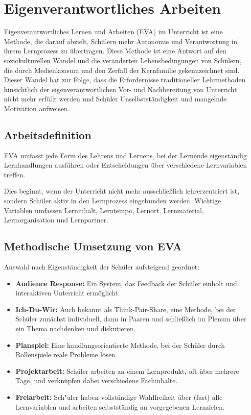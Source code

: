 
\section{Eigenverantwortliches Arbeiten}\label{EVA}

Eigenverantwortliches Lernen und Arbeiten (EVA) im Unterricht ist eine Methode, die darauf abzielt, Sch\"ulern mehr Autonomie und Verantwortung in ihrem Lernprozess zu \"ubertragen. Diese Methode ist eine Antwort auf den soziokulturellen Wandel und die ver\"anderten Lebensbedingungen von Sch\"ulern, die durch Medienkonsum und den Zerfall der Kernfamilie gekennzeichnet sind. Dieser Wandel hat zur Folge, dass die Erfordernisse traditioneller Lehrmethoden hinsichtlich der eigenverantwortlichen Vor- und Nachbereitung von Unterricht nicht mehr erf\"ullt werden und Sch\"uler Unselbstst\"andigkeit und mangelnde Motivation aufweisen.

\subsection{Arbeitsdefinition}
EVA umfasst jede Form des Lehrens und Lernens, bei der Lernende eigenständig Lernhandlungen ausführen oder Entscheidungen über verschiedene Lernvariablen treffen.

Dies beginnt, wenn der Unterricht nicht mehr ausschließlich lehrerzentriert ist, sondern Schüler aktiv in den Lernprozess eingebunden werden. Wichtige Variablen umfassen Lerninhalt, Lerntempo, Lernort, Lernmaterial, Lernorganisation und Lernpartner.

\subsection{Methodische Umsetzung von EVA}
Auswahl nach Eigenst\"andigkeit der Sch\"uler aufsteigend geordnet:
\begin{itemize}
	\item \textbf{Audience Response:} Ein System, das Feedback der Sch\"uler einholt und interaktiven Unterricht erm\"oglicht.
	\item  \textbf{Ich-Du-Wir:} Auch bekannt als \glqq Think-Pair-Share\grqq, eine Methode, bei der Sch\"uler zunächst individuell, dann in Paaren und schlie\ss lich im Plenum über ein Thema nachdenken und diskutieren.
	\item \textbf{Planspiel:} Eine handlungsorientierte Methode, bei der Sch\"uler durch Rollenspiele reale Probleme l\"osen.
	\item \textbf{Projektarbeit:} Sch\"uler arbeiten an einem Lernprodukt, oft \"uber mehrere Tage, und verkn\"upfen dabei verschiedene Fachinhalte.
	\item \textbf{Freiarbeit:} Sch"uler haben vollst\"andige Wahlfreiheit \"uber (fast) alle Lernvariablen und arbeiten selbstst\"andig an vorgegebenen Lernzielen.
\end{itemize}

